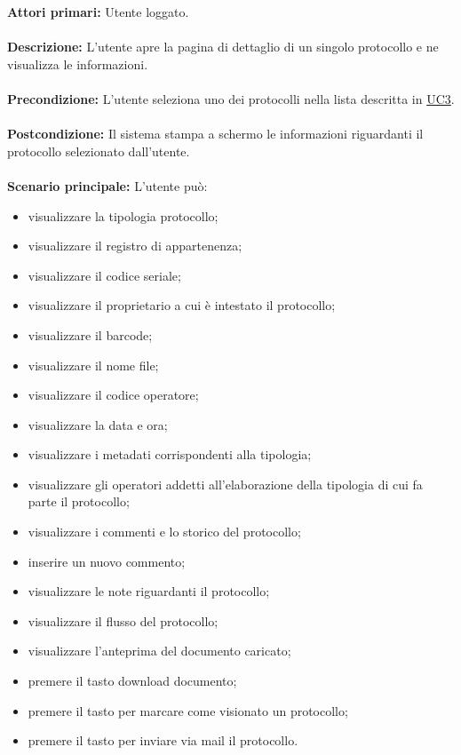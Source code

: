     \textbf{Attori primari:} Utente loggato.
    \\ 
    \\
    \textbf{Descrizione:} L'utente apre la pagina di dettaglio di un singolo protocollo e ne visualizza le informazioni.
    \\
    \\
    \textbf{Precondizione:} L'utente seleziona uno dei protocolli nella lista descritta in \hyperref[UC3]{UC3}.
    \\
    \\
    \textbf{Postcondizione:} Il sistema stampa a schermo le informazioni riguardanti il protocollo selezionato dall'utente.
    \\
    \\
    \textbf{Scenario principale:} L'utente può:
            \begin{itemize}
                \item visualizzare la tipologia protocollo;
                \item visualizzare il registro di appartenenza;
                \item visualizzare il codice seriale;
                \item visualizzare il proprietario a cui è intestato il protocollo;
                \item visualizzare il barcode;
                \item visualizzare il nome file;
                \item visualizzare il codice operatore;
                \item visualizzare la data e ora;
                \item visualizzare i metadati corrispondenti alla tipologia;
                \item visualizzare gli operatori addetti all'elaborazione della tipologia di cui fa parte il protocollo;
                \item visualizzare i commenti e lo storico del protocollo;
                \item inserire un nuovo commento;
                \item visualizzare le note riguardanti il protocollo;
                \item visualizzare il flusso del protocollo;
                \item visualizzare l'anteprima del documento caricato;
                \item premere il tasto download documento;
                \item premere il tasto per marcare come visionato un protocollo;
                \item premere il tasto per inviare via mail il protocollo.
            \end{itemize}
        \newpage
        
